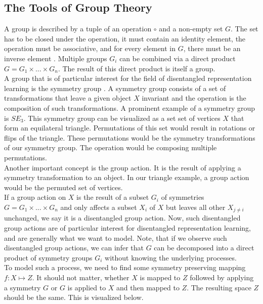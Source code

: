 \documentclass{article} %
\begin{document}
\subsection*{The Tools of Group Theory}
A group is described by a tuple of an operation $\circ$ and a non-empty set $G$. The set has to be closed under the operation, it must contain an identity element, the operation must be associative, and for every element in $G$, there must be an inverse element \cite{benkart1987abstract}.
Multiple groups $G_i$ can be combined via a direct product $G = G_1 \times ... \times G_n$. The result of this direct product is itself a group.\\%
A group that is of particular interest for the field of disentangled representation learning is the symmetry group \cite{benkart1987abstract}.
A symmetry group consists of a set of transformations that leave a given object $X$ invariant and the operation is the composition of such transformations. A prominent example of a symmetry group is $SE_3$. This symmetry group can be visualized as a set set of vertices $X$ that form an equilateral triangle. Permutations of this set would result in rotations or flips of the triangle. These permutations would be the symmetry transformations of our symmetry group. The operation would be composing multiple permutations.\\
Another important concept is the group action. It is the result of applying a symmetry transformation to an object. In our triangle example, a group action would be the permuted set of vertices.\\
If a group action on $X$ is the result of a subset $G_i$ of symmetries $G= G_1 \times ... \times G_n$ and only affects a subset $X_i$ of $X$ but leaves all other $X_{j\neq i}$ unchanged, we say it is a disentangled group action. Now, such disentangled group actions are of particular interest for disentangled representation learning, and are generally what we want to model. Note, that if we observe such disentangled group actions, we can infer that $G$ can be decomposed into a direct product of symmetry groups $G_i$ without knowing the underlying processes.\\
To model such a process, we need to find some symmetry preserving mapping $f:X\mapsto Z$. It should not matter, whether $X$ is mapped to $Z$ followed by applying a symmetry $G$ or $G$ is applied to $X$ and then mapped to $Z$. The resulting space $Z$ should be the same. This is visualized below.
\end{document}
